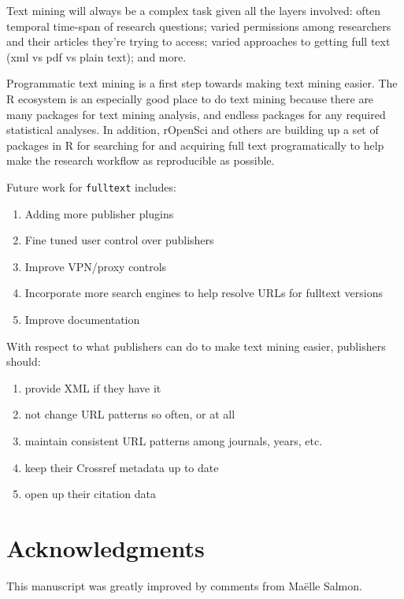 \documentclass[author-year, review, 11pt]{components/elsarticle} %
\def\tightlist{}
\begin{document}
Text mining will always be a complex task given all the layers involved:
often temporal time-span of research questions; varied permissions among
researchers and their articles they're trying to access; varied
approaches to getting full text (xml vs pdf vs plain text); and more.

Programmatic text mining is a first step towards making text mining
easier. The R ecosystem is an especially good place to do text mining
because there are many packages for text mining analysis, and endless
packages for any required statistical analyses. In addition, rOpenSci
and others are building up a set of packages in R for searching for and
acquiring full text programatically to help make the research workflow
as reproducible as possible.

Future work for \texttt{fulltext} includes:

\begin{enumerate}
\def\labelenumi{\arabic{enumi}.}
\tightlist
\item
  Adding more publisher plugins
\item
  Fine tuned user control over publishers
\item
  Improve VPN/proxy controls
\item
  Incorporate more search engines to help resolve URLs for fulltext
  versions
\item
  Improve documentation
\end{enumerate}

With respect to what publishers can do to make text mining easier,
publishers should:

\begin{enumerate}
\def\labelenumi{\arabic{enumi}.}
\tightlist
\item
  provide XML if they have it
\item
  not change URL patterns so often, or at all
\item
  maintain consistent URL patterns among journals, years, etc.
\item
  keep their Crossref metadata up to date
\item
  open up their citation data
\end{enumerate}

\hypertarget{acknowledgments}{%
\section{Acknowledgments}\label{acknowledgments}}

This manuscript was greatly improved by comments from Maëlle Salmon.
\end{document}

